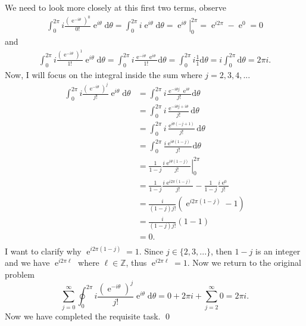 \documentclass[10pt]{amsart}
\newcommand{\D}{\mathrm{d}}
\DeclareMathOperator{\E}{e}
\theoremstyle{nonumberplain}
\begin{document}
\begin{enumerate}[label={\bf {\arabic*}:}]
$$$$
We need to look more closely at this first two terms, observe
\begin{align*}
\int_0^{2\pi} i \frac{\left(\E^{-i\theta}\right)^0}{0!} {\E^{i\theta}} \D \theta
= \int_0^{2\pi} i \E^{i\theta} \D \theta
= \left. \E^{i\theta} \right|_0^{2\pi}
= \E^{i2\pi} - \E^{0}
= 0
\end{align*}
and
\begin{align*}
\int_0^{2\pi} i \frac{\left(\E^{-i\theta}\right)^1}{1!} \E^{i\theta} \D \theta = \int_0^{2\pi} i \frac{\E^{-i\theta}\E^{i\theta}}{1!} \D \theta = \int_0^{2\pi} i \frac{1}{1} \D \theta = i\int_0^{2\pi}\D \theta = 2\pi i.
\end{align*}
Now, I will focus on the integral inside the sum where $j = 2, 3, 4, ...$
\begin{align*}
\int_0^{2\pi} i \frac{\left(\E^{-i\theta}\right)^j}{j!} {\E^{i\theta}} \D \theta &= \int_0^{2\pi} i \frac{\E^{-i\theta j}\E^{i\theta}}{j!} \D \theta \\
	&= \int_0^{2\pi} i \frac{\E^{-i\theta j + i\theta}}{j!} \D \theta \\
	&= \int_0^{2\pi} i \frac{\E^{i\theta\left( - j + 1\right)}}{j!} \D \theta \\
	&= \int_0^{2\pi} \frac{i\E^{i\theta\left(1 - j\right)}}{j!} \D \theta \\
	&= \left. \frac{1}{1 - j} \frac{i\E^{i\theta\left(1 - j\right)}}{j!} \right|_0^{2 \pi} \\
	&= \frac{1}{1 - j} \frac{i\E^{i2\pi\left(1 - j\right)}}{j!} - \frac{1}{1 - j} \frac{i\E^0}{j!} \\
	&= \frac{i}{\left(1 - j\right)j!}\left(\E^{i2\pi\left(1 - j\right)} - 1 \right) \\
	&= \frac{i}{\left(1 - j\right)j!}\left(1 - 1 \right) \\
	&= 0. \\
\end{align*}
I want to clarify why $\E^{i2\pi\left(1 - j\right)} = 1$.
Since $j \in \{2, 3, ...\}$, then $1 - j$ is an integer and we have $\E^{i2\pi \ell}$ where $\ell \in \mathbb Z$, thus $\E^{i2\pi \ell} = 1$.
Now we return to the original problem
$$
\sum_{j=0}^{\infty} \oint_0^{2\pi} i \frac{\left(\E^{-i\theta}\right)^j}{j!} {\E^{i\theta}} \D \theta = 0 + 2\pi i + \sum_{j=2}^{\infty} 0 = 2\pi i.
$$
Now we have completed the requisite task.
\qed
\\


\end{enumerate}
\end{document}
